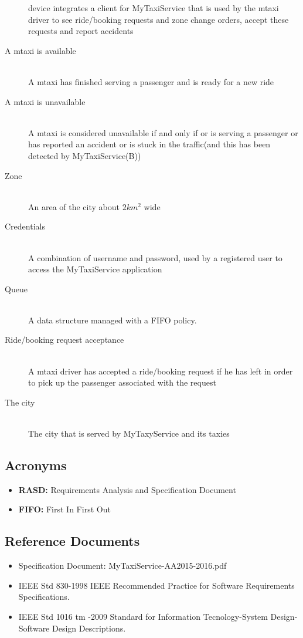 \documentclass[11pt]{article} %
\begin{document}
\begin{description}
	      device integrates a client for MyTaxiService that is used by the mtaxi driver to see ride/booking requests and zone change orders, accept
	      these requests and report accidents
	      \item [A mtaxi is available] \hfill \\ A mtaxi has finished serving a passenger and is ready for a new ride
	      \item [A mtaxi is unavailable]\hfill \\ A mtaxi is considered unavailable if and only if or is serving a passenger or has reported an accident or
	      is stuck in the traffic(and this has been detected by MyTaxiService(B))
	      \item [Zone] \hfill \\An area of the city about $2km^2$ wide
	      \item [Credentials] \hfill \\ A combination of username and password, used by a registered user to access the MyTaxiService application
	      \item [Queue] \hfill \\ A data structure managed with a FIFO policy.
	      \item [Ride/booking request acceptance] \hfill \\ A mtaxi driver has accepted a ride/booking request if he has left in order to pick up the passenger
	      associated with the request
	      \item [The city] \hfill \\The city that is served by MyTaxyService and its taxies
	\end{description}

    \subsection{Acronyms}
      \begin{itemize}
		\item \textbf{RASD:} Requirements Analysis and Specification Document
      		\item \textbf{FIFO:} First In First Out
      \end{itemize}

    \subsection{Reference Documents}
	\begin{itemize}
	      \item Specification Document: MyTaxiService-AA2015-2016.pdf
	      \item IEEE Std 830-1998 IEEE Recommended Practice for Software Requirements Specifications.
	      \item  IEEE Std 1016 tm -2009 Standard for Information Tecnology-System Design-Software Design Descriptions.
	\end{itemize}
\end{document}
